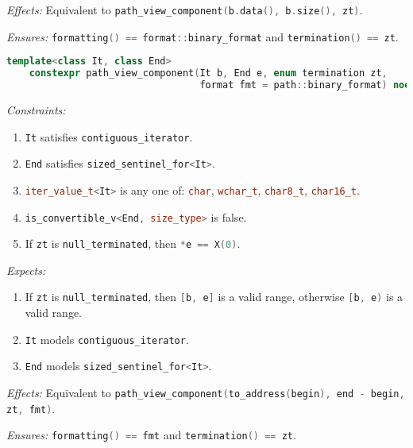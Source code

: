\documentclass[11pt]{article}
\newcommand{\code}[2][cpp]{\lstinline[language=#1,basicstyle=\small\ttfamily]{#2}}
\newcommand{\desc}[1]{\textit{#1}}
\newcommand{\constraints}{\desc{Constraints: }}
\newcommand{\effects}{\desc{Effects: }}
\newcommand{\expects}{\desc{Expects: }}
\newcommand{\ensures}{\desc{Ensures: }}
\begin{document}
\effects Equivalent to \code{path_view_component(b.data(), b.size(), zt)}.

\ensures \code{formatting() == format::binary_format} and \code{termination() == zt}.\\


\begin{lstlisting}[language=cpp]
    template<class It, class End>
    constexpr path_view_component(It b, End e, enum termination zt,
                                  format fmt = path::binary_format) noexcept;
\end{lstlisting}
\constraints \begin{enumerate}
    \item \code{It} satisfies \code{contiguous_iterator}.
    \item \code{End} satisfies \code{sized_sentinel_for<It>}.
    \item \code{iter_value_t<It>} is any one of: \code{char}, \code{wchar_t}, \code{char8_t}, \code{char16_t}.
    \item \code{is_convertible_v<End, size_type>} is false.
    \item If \code{zt} is \code{null_terminated}, then \code{*e == X(0)}.
\end{enumerate}
\expects \begin{enumerate}
    \item If \code{zt} is \code{null_terminated}, then \code{[b, e]} is a valid range, otherwise \code{[b, e)} is a valid range.
    \item \code{It} models \code{contiguous_iterator}.
    \item \code{End} models \code{sized_sentinel_for<It>}.
\end{enumerate}

\effects Equivalent to \code{path_view_component(to_address(begin), end - begin, zt, fmt)}.

\ensures \code{formatting() == fmt} and \code{termination() == zt}.\\
\end{document}
